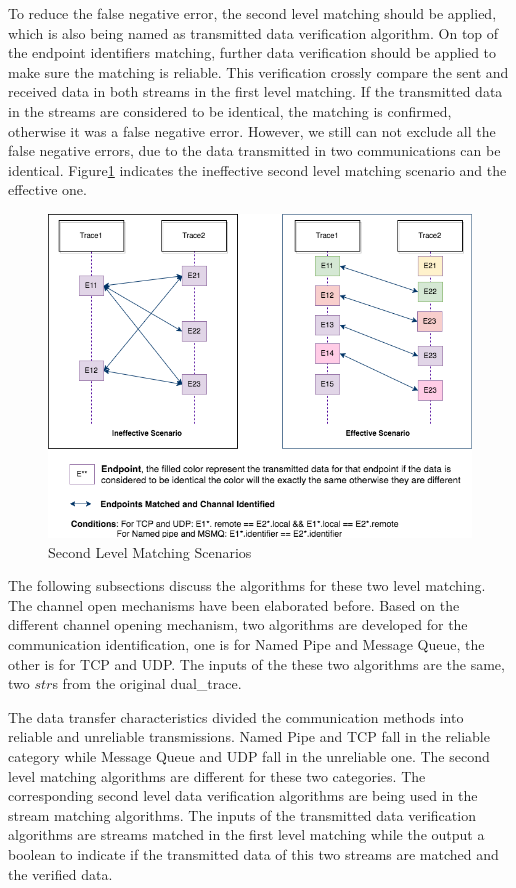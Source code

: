 To reduce the false negative error, the second level matching should be applied, which is also being named as transmitted data verification algorithm. On top of the endpoint identifiers matching, further data verification should be applied to make sure the matching is reliable. This verification crossly compare the sent and received data in both streams in the first level matching. If the transmitted data in the streams are considered to be identical, the matching is confirmed, otherwise it was a false negative error. However, we still can not exclude all the false negative errors, due to the data transmitted in two communications can be identical. Figure\ref{secondlevelmatching} indicates the ineffective second level matching scenario and the effective one.

\begin{figure}[H]
\centerline{\includegraphics[scale=0.55]{Figures/secondlevelmatching}}
 \caption{Second Level Matching Scenarios}
\label{secondlevelmatching}
\end{figure}


The following subsections discuss the algorithms for these two level matching. The channel open mechanisms have been elaborated before. Based on the different channel opening mechanism, two algorithms are developed for the communication identification, one is for Named Pipe and Message Queue, the other is for TCP and UDP. The inputs of the these two algorithms are the same, two $str$s from the original dual\_trace.

The data transfer characteristics divided the communication methods into reliable and unreliable transmissions. Named Pipe and TCP fall in the reliable category while Message Queue and UDP fall in the unreliable one. The second level matching algorithms are different for these two categories. The corresponding second level data verification algorithms are being used in the stream matching algorithms. The inputs of the transmitted data verification algorithms are streams matched in the first level matching while the output a boolean to indicate if the transmitted data of this two streams are matched and the verified data.

